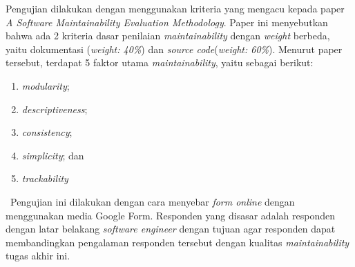 Pengujian dilakukan dengan menggunakan kriteria yang mengacu kepada paper \textit{A Software Maintainability Evaluation Methodology}\cite{peercy_software_nodate}. Paper ini menyebutkan bahwa ada 2 kriteria dasar penilaian \textit{maintainability} dengan \textit{weight} berbeda, yaitu dokumentasi (\textit{weight: 40\%}) dan \textit{source code}(\textit{weight: 60\%}). Menurut paper tersebut, terdapat 5 faktor utama \textit{maintainability}, yaitu sebagai berikut:
\begin{enumerate}
	\item \textit{modularity};
	\item \textit{descriptiveness};
	\item \textit{consistency};
	\item \textit{simplicity}; dan
	\item \textit{trackability}
\end{enumerate}

\ \indent Pengujian ini dilakukan dengan cara menyebar \textit{form online} dengan menggunakan media Google Form. Responden yang disasar adalah responden dengan latar belakang \textit{software engineer} dengan tujuan agar responden dapat membandingkan pengalaman responden tersebut dengan kualitas \textit{maintainability} tugas akhir ini.